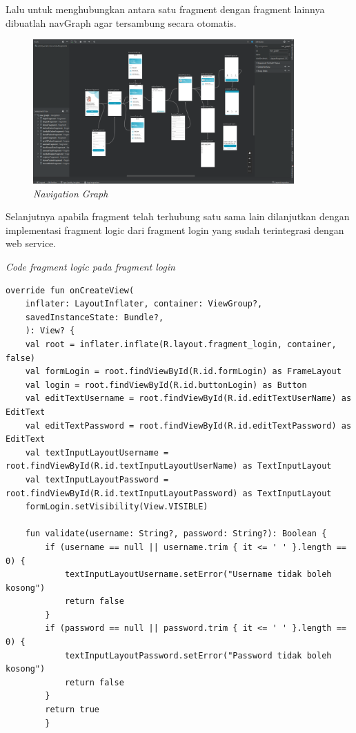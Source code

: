\begin{enumerate}
	Lalu untuk menghubungkan antara satu fragment dengan fragment lainnya dibuatlah navGraph agar tersambung secara otomatis.
	\begin{figure}[H]
		\centering
		\includegraphics[keepaspectratio, width=10cm]{gambar/nav_graph}
		\caption{\textit{Navigation Graph}}
		\label{gambar:nav_graph}
	\end{figure}
	
	Selanjutnya apabila fragment telah terhubung satu sama lain dilanjutkan dengan implementasi fragment logic dari fragment login yang sudah terintegrasi dengan web service.
	
	\textit{Code fragment logic pada fragment login}
	\begin{lstlisting}
override fun onCreateView(
	inflater: LayoutInflater, container: ViewGroup?,
	savedInstanceState: Bundle?,
    ): View? {
	val root = inflater.inflate(R.layout.fragment_login, container, false)
	val formLogin = root.findViewById(R.id.formLogin) as FrameLayout
	val login = root.findViewById(R.id.buttonLogin) as Button
	val editTextUsername = root.findViewById(R.id.editTextUserName) as EditText
	val editTextPassword = root.findViewById(R.id.editTextPassword) as EditText
	val textInputLayoutUsername = root.findViewById(R.id.textInputLayoutUserName) as TextInputLayout
	val textInputLayoutPassword = root.findViewById(R.id.textInputLayoutPassword) as TextInputLayout
	formLogin.setVisibility(View.VISIBLE)

	fun validate(username: String?, password: String?): Boolean {
		if (username == null || username.trim { it <= ' ' }.length == 0) {
			textInputLayoutUsername.setError("Username tidak boleh kosong")
			return false
		}
		if (password == null || password.trim { it <= ' ' }.length == 0) {
			textInputLayoutPassword.setError("Password tidak boleh kosong")
			return false
		}
		return true
        }


\end{lstlisting}
\end{enumerate}
